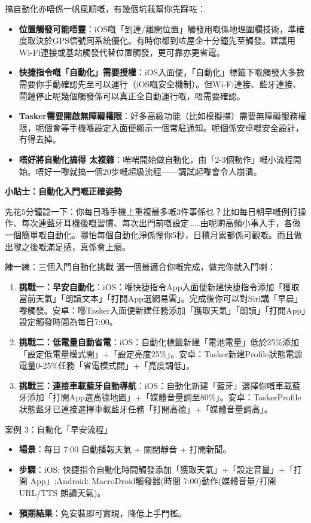 搞自動化亦唔係一帆風順嘅，有幾個坑我幫你先踩咗：

\begin{itemize}
  \item \textbf{位置觸發可能唔靈}：iOS嘅「到達/離開位置」觸發用嘅係地理圍欄技術，準確度取決於GPS信號同系統優化。有時你都到咗屋企十分鐘先至觸發。建議用Wi-Fi連接或基站觸發代替位置觸發，更可靠亦更省電。
  \item \textbf{快捷指令嘅「自動化」需要授權}：iOS入面便，「自動化」標籤下嘅觸發大多數需要你手動確認先至可以運行（iOS嘅安全機制）。但Wi-Fi連接、藍牙連接、鬧鐘停止呢幾個觸發係可以真正全自動運行嘅，唔需要確認。
  \item \textbf{Tasker需要開啟無障礙權限}：好多高級功能（比如模擬㩒）需要無障礙服務權限，呢個會等手機喺設定入面便顯示一個常駐通知。呢個係安卓嘅安全設計，冇得去掉。
  \item \textbf{唔好將自動化搞得 太複雜}：啱啱開始做自動化，由「2-3個動作」嘅小流程開始。唔好一嚟就搞一個20步嘅超級流程——調試起嚟會令人崩潰。
\end{itemize}

\textbf{小貼士：自動化入門嘅正確姿勢}\par

先花5分鐘諗一下：你每日喺手機上重複最多嘅3件事係乜？比如每日朝早嘅例行操作、每次連藍牙耳機後嘅習慣、每次出門前嘅設定……由呢啲高頻小事入手，各做一個簡單嘅自動化。哪怕每個自動化淨係慳你5秒，日積月累都係可觀嘅。而且做出嚟之後嘅滿足感，真係會上癮。

\begin{tcbpractice}{練一練：三個入門自動化挑戰}
選一個最適合你嘅完成，做完你就入門喇：

\begin{enumerate}
  \item \textbf{挑戰一：早安自動化}：iOS：喺快捷指令App入面便新建快捷指令添加「獲取當前天氣」「朗讀文本」「打開App選網易雲」。完成後你可以對Siri講「早晨」嚟觸發。安卓：喺Tasker入面便新建任務添加「獲取天氣」「朗讀」「打開App」設定觸發時間為每日7:00。
  \item \textbf{挑戰二：低電量自動省電}：iOS：自動化標籤新建「電池電量」低於25\%添加「設定低電量模式開」+「設定亮度25\%」。安卓：Tasker新建Profile狀態電源電量0-25\%任務「省電模式開」+「亮度調低」。
  \item \textbf{挑戰三：連接車載藍牙自動導航}：iOS：自動化新建「藍牙」選擇你嘅車載藍牙添加「打開App選高德地圖」+「媒體音量調至80\%」。安卓：TaskerProfile狀態藍牙已連接選擇車載藍牙任務「打開高德」+「媒體音量調高」。
\end{enumerate}

\end{tcbpractice}

\begin{tcbinfo}{案例 3：自動化「早安流程」}
\begin{itemize}
  \item \textbf{場景}：每日 7:00 自動播報天氣 + 關閉靜音 + 打開新聞。
  \item \textbf{步驟}：iOS: 快捷指令自動化時間觸發添加「獲取天氣」+「設定音量」+「打開 App」;Android: MacroDroid觸發器(時間 7:00)動作(媒體音量/打開 URL/TTS 朗讀天氣)。
  \item \textbf{預期結果}：免安裝即可實現，降低上手門檻。
\end{itemize}

\end{tcbinfo}
